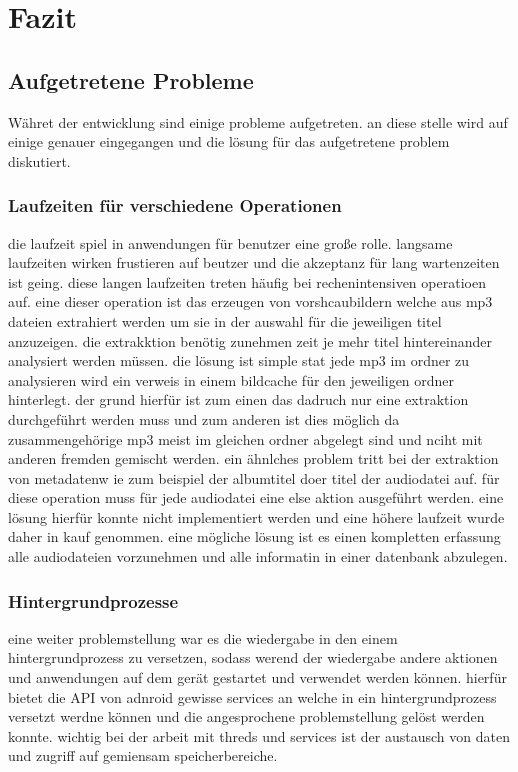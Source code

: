 \section{Fazit}
\subsection{Aufgetretene Probleme}
Währet der entwicklung sind einige probleme aufgetreten. an diese stelle wird auf einige genauer eingegangen und  die lösung für das aufgetretene problem diskutiert.
\subsubsection{Laufzeiten für verschiedene Operationen}
die laufzeit spiel in anwendungen für benutzer eine große rolle. langsame laufzeiten wirken frustieren auf beutzer und die akzeptanz für lang wartenzeiten ist geing. diese langen laufzeiten treten häufig bei rechenintensiven operatioen auf. eine dieser operation ist das erzeugen von vorshcaubildern welche aus mp3 dateien extrahiert werden um sie  in der auswahl für die jeweiligen titel anzuzeigen.
die extrakktion benötig zunehmen zeit je mehr titel hintereinander analysiert werden müssen. die lösung ist simple stat jede mp3 im ordner zu analysieren wird ein verweis in einem bildcache für den jeweiligen ordner hinterlegt. der grund hierfür ist zum einen das dadruch nur eine extraktion durchgeführt werden muss und zum anderen ist dies möglich da zusammengehörige mp3 meist im gleichen ordner abgelegt sind und nciht mit anderen fremden gemischt werden.
ein ähnlches problem tritt bei der extraktion von metadatenw ie zum beispiel der albumtitel doer titel der audiodatei auf. für diese operation muss für jede audiodatei eine else aktion ausgeführt werden. eine lösung hierfür konnte nicht implementiert werden und eine höhere laufzeit wurde daher in kauf genommen. eine mögliche lösung ist es einen kompletten erfassung alle audiodateien vorzunehmen und alle informatin in einer datenbank abzulegen.
\subsubsection{Hintergrundprozesse}
eine weiter problemstellung war es die wiedergabe in den einem hintergrundprozess zu versetzen, sodass werend der wiedergabe andere aktionen und anwendungen auf dem gerät gestartet und verwendet werden können. hierfür bietet die API von adnroid gewisse services an welche in ein hintergrundprozess versetzt werdne können und die angesprochene problemstellung gelöst werden konnte.
wichtig bei der arbeit mit threds und services ist der austausch von daten und zugriff auf gemiensam speicherbereiche.

